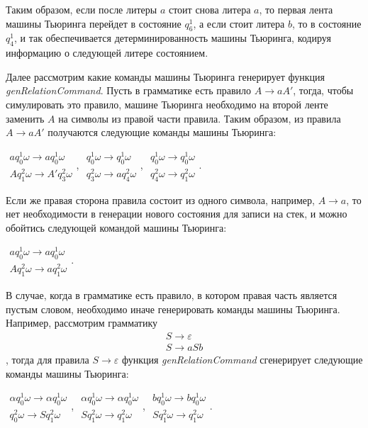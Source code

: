 \documentclass[14pt]{matmex-diploma-custom}
\begin{document}
Таким образом, если после литеры $a$ стоит снова литера $a$, то первая лента машины Тьюринга перейдет в состояние $q_6^1$, а если стоит литера $b$, то в состояние $q_4^1$, и так обеспечивается детерминированность машины Тьюринга, кодируя информацию о следующей литере состоянием. 

Далее рассмотрим какие команды машины Тьюринга генерирует функция \textit{genRelationCommand}.
Пусть в грамматике есть правило $A \to a A'$, тогда, чтобы симулировать это правило, машине Тьюринга
необходимо на второй ленте заменить $A$ на символы из правой части правила. Таким образом, из правила $A \to a A'$ получаются 
следующие команды машины Тьюринга: 

$\begin{array}{lcl}
    a q_0^1 \omega \to a q_0^1 \omega \\
    A q_1^2 \omega \to A' q_3^2 \omega 
\end{array}$,
$\begin{array}{lcl}
    q_0^1 \omega \to q_0^1 \omega \\
    q_3^2 \omega \to a q_4^2 \omega 
\end{array}$,
$\begin{array}{lcl}
    q_0^1 \omega \to q_0^1 \omega \\
    q_4^2 \omega \to q_1^2 \omega 
\end{array}$. 

Если же правая сторона правила состоит из одного символа, например, $A \to a$, то нет необходимости в генерации нового состояния для записи на стек, и можно обойтись следующей командой машины Тьюринга: 

$\begin{array}{lcl}
    a q_0^1 \omega \to a q_0^1 \omega \\
    A q_1^2 \omega \to a q_1^2 \omega 
\end{array}$. 

В случае, когда в грамматике есть правило, в котором правая часть является пустым словом, необходимо иначе генерировать команды машины Тьюринга. Например, рассмотрим грамматику 
$$\begin{array}{lcl}
    S \to \varepsilon \\
    S \to a S b
\end{array}$$
, тогда для правила $S \to \varepsilon$ функция \textit{genRelationCommand} сгенерирует следующие команды машины Тьюринга:

$\begin{array}{lcl}
    \alpha q_0^1 \omega \to \alpha q_0^1 \omega \\
    q_0^2 \omega \to S q_1^2 \omega 
\end{array}$,
$\begin{array}{lcl}
    \alpha q_0^1 \omega \to \alpha q_0^1 \omega \\
    S q_1^2 \omega \to q_1^2 \omega 
\end{array}$,
$\begin{array}{lcl}
    b q_0^1 \omega \to b q_0^1 \omega \\
    S q_1^2 \omega \to q_1^2 \omega 
\end{array}$.
\end{document}
